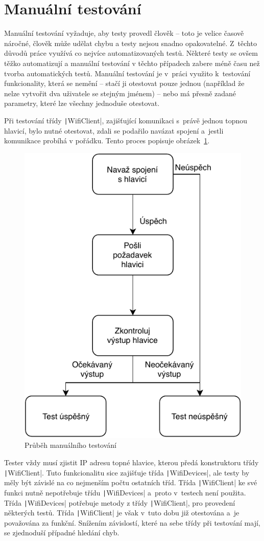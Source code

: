 \documentclass[thesis=B,czech]{FITthesis}[2012/10/20]
\begin{document}
\section{Manuální testování}

Manuální testování vyžaduje, aby testy provedl člověk – toto je velice časově náročné, člověk může udělat chybu a testy nejsou snadno opakovatelné. Z~těchto důvodů práce využívá co nejvíce automatizovaných testů. Některé testy se ovšem těžko automatizují a manuální testování v těchto případech zabere méně času než tvorba automatických testů. Manuální testování je v~práci využito k~testování funkcionality, která se nemění – stačí ji otestovat pouze jednou (například že nelze vytvořit dva uživatele se stejným jménem) – nebo má přesně zadané parametry, které lze všechny jednoduše otestovat.

Při testování třídy \texttt|WifiClient|, zajišťující komunikaci s~právě jednou topnou hlavicí, bylo nutné otestovat, zdali se podařilo navázat spojení a~jestli komunikace probíhá v pořádku. Tento proces popisuje obrázek~\ref{fig:manualTest}.

\begin{figure}\centering
	\includegraphics[width=.7\textwidth]{diagrams/ManualTest}
	\caption{Průběh manuálního testování}\label{fig:manualTest}
\end{figure}

Tester vždy musí zjistit IP adresu topné hlavice, kterou předá konstruktoru třídy \texttt|WifiClient|. Tuto funkcionalitu sice zajišťuje třída \texttt|WifiDevices|, ale testy by měly být závislé na co nejmenším počtu ostatních tříd. Třída \texttt|WifiClient| ke své funkci nutně nepotřebuje třídu \texttt|WifiDevices| a~proto v~testech není použita. Třída \texttt|WifiDevices| potřebuje metody z třídy \texttt|WifiClient|, pro provedení některých testů. Třída \texttt|WifiClient| je však v~tuto dobu již otestována a~je považována za funkční. Snížením závislostí, které na sebe třídy při testování mají, se zjednoduší případné hledání chyb.
\end{document}

